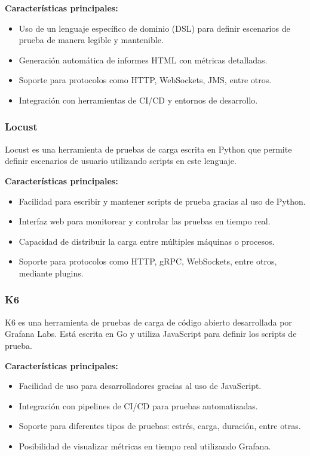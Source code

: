 \textbf{Características principales:}
\begin{itemize}
    \item Uso de un lenguaje específico de dominio (DSL) para definir escenarios de prueba de manera legible y mantenible.
    \item Generación automática de informes HTML con métricas detalladas.
    \item Soporte para protocolos como HTTP, WebSockets, JMS, entre otros.
    \item Integración con herramientas de CI/CD y entornos de desarrollo.
\end{itemize}

\subsubsection{Locust}

Locust es una herramienta de pruebas de carga escrita en Python que permite definir escenarios de usuario utilizando scripts en este lenguaje.

\textbf{Características principales:}
\begin{itemize}
    \item Facilidad para escribir y mantener scripts de prueba gracias al uso de Python.
    \item Interfaz web para monitorear y controlar las pruebas en tiempo real.
    \item Capacidad de distribuir la carga entre múltiples máquinas o procesos.
    \item Soporte para protocolos como HTTP, gRPC, WebSockets, entre otros, mediante plugins.
\end{itemize}

\subsubsection{K6}

K6 es una herramienta de pruebas de carga de código abierto desarrollada por Grafana Labs. Está escrita en Go y utiliza JavaScript para definir los scripts de prueba.

\textbf{Características principales:}
\begin{itemize}
    \item Facilidad de uso para desarrolladores gracias al uso de JavaScript.
    \item Integración con pipelines de CI/CD para pruebas automatizadas.
    \item Soporte para diferentes tipos de pruebas: estrés, carga, duración, entre otras.
    \item Posibilidad de visualizar métricas en tiempo real utilizando Grafana.
\end{itemize}

